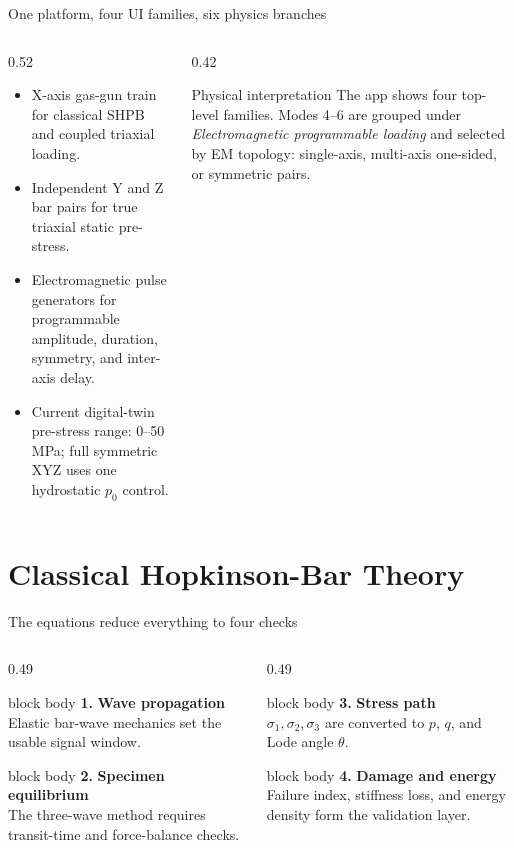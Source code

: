\documentclass[11pt,aspectratio=169]{beamer}
\newcommand{\numcard}[3]{%
  \begin{beamercolorbox}[wd=\textwidth, rounded=true, sep=0.7ex, leftskip=0.8ex, rightskip=0.8ex]{block body}
    {\large\textbf{\color{TUSTteal}#1.}} \textbf{#2}\\[2pt] #3
  \end{beamercolorbox}%
}
\begin{document}
\begin{frame}{One platform, four UI families, six physics branches}
  \begin{columns}[T,onlytextwidth]
    \begin{column}{0.52\textwidth}
      \begin{itemize}
        \item X-axis gas-gun train for classical SHPB and coupled triaxial loading.
        \item Independent Y and Z bar pairs for true triaxial static pre-stress.
        \item Electromagnetic pulse generators for programmable amplitude,
              duration, symmetry, and inter-axis delay.
        \item Current digital-twin pre-stress range: 0--50 MPa; full
              symmetric XYZ uses one hydrostatic $p_0$ control.
      \end{itemize}
    \end{column}
    \begin{column}{0.42\textwidth}
      \begin{block}{Physical interpretation}
        The app shows four top-level families. Modes 4--6 are grouped under
        \emph{Electromagnetic programmable loading} and selected by EM
        topology: single-axis, multi-axis one-sided, or symmetric pairs.
      \end{block}
    \end{column}
  \end{columns}
\end{frame}

\section{Classical Hopkinson-Bar Theory}

\begin{frame}{The equations reduce everything to four checks}
  \small
  \begin{columns}[T,onlytextwidth]
    \begin{column}{0.49\textwidth}
      \numcard{1}{Wave propagation}{Elastic bar-wave mechanics set the usable signal window.}
      \vspace{0.22cm}
      \numcard{2}{Specimen equilibrium}{The three-wave method requires transit-time and force-balance checks.}
    \end{column}
    \begin{column}{0.49\textwidth}
      \numcard{3}{Stress path}{$\sigma_1,\sigma_2,\sigma_3$ are converted to $p$, $q$, and Lode angle $\theta$.}
      \vspace{0.22cm}
      \numcard{4}{Damage and energy}{Failure index, stiffness loss, and energy density form the validation layer.}
    \end{column}
  \end{columns}
\end{frame}
\end{document}
